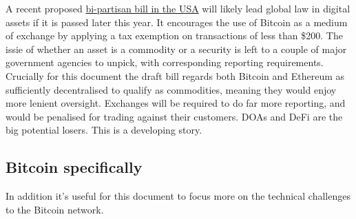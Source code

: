 A recent proposed \href{https://bitcoinmagazine.com/business/heres-whats-in-senator-lummis-bitcoin-bill}{bi-partisan bill in the USA} will likely lead global law in digital assets if it is passed later this year. It encourages the use of Bitcoin as a medium of exchange by applying a tax exemption on transactions of less than \$200. The issie of whether an asset is a commodity or a security is left to a couple of major government agencies to unpick, with corresponding reporting requirements. Crucially for this document the draft bill regards both Bitcoin and Ethereum as sufficiently decentralised to qualify as commodities, meaning they would enjoy more lenient oversight. Exchanges will be required to do far more reporting, and would be penalised for trading against their customers. DOAs and DeFi are the big potential losers. This is a developing story.
\subsection{Bitcoin specifically}
\noindent In addition it's useful for this document to focus more on the technical challenges to the Bitcoin network.\par
